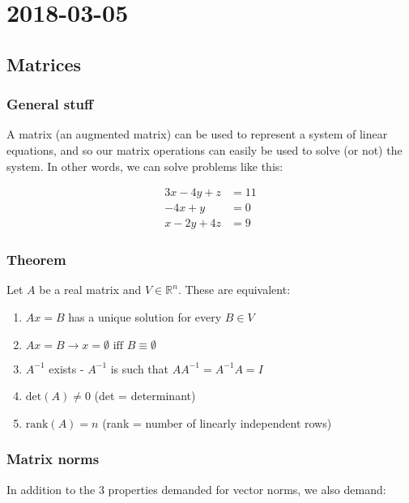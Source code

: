 \section{2018-03-05}

\subsection{Matrices}

\subsubsection{General stuff}

A matrix (an augmented matrix) can be used to represent a system of linear equations, and so our matrix operations can easily be used to solve (or not) the system. In other words, we can solve problems like this:

\begin{align*}
  3x -  4y + z  &= 11 \\
  -4x + y       &= 0 \\
  x -   2y + 4z &= 9
\end{align*}

\subsubsection{Theorem}

Let $A$ be a real matrix and $V \in \mathbb{R}^n$. These are equivalent:

\begin{enumerate}
  \item $Ax = B$ has a unique solution for every $B \in V$
  \item $Ax = B \rightarrow x = \emptyset \text{ iff } B \equiv \emptyset$
  \item $A^{-1}$ exists - $A^{-1}$ is such that $AA^{-1} = A^{-1}A = I$
  \item $\text{det}(A) \neq 0$ (det = determinant)
  \item $\text{rank}(A) = n$ (rank = number of linearly independent rows)
\end{enumerate}

\subsubsection{Matrix norms}

In addition to the 3 properties demanded for vector norms, we also demand:

